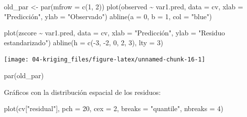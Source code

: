 \documentclass[
  spanish,
]{book}
\newenvironment{Shaded}{\begin{snugshade}}{\end{snugshade}}
\newcommand{\AttributeTok}[1]{\textcolor[rgb]{0.77,0.63,0.00}{#1}}
\newcommand{\DecValTok}[1]{\textcolor[rgb]{0.00,0.00,0.81}{#1}}
\newcommand{\FunctionTok}[1]{\textcolor[rgb]{0.00,0.00,0.00}{#1}}
\newcommand{\NormalTok}[1]{#1}
\newcommand{\OtherTok}[1]{\textcolor[rgb]{0.56,0.35,0.01}{#1}}
\newcommand{\SpecialCharTok}[1]{\textcolor[rgb]{0.00,0.00,0.00}{#1}}
\newcommand{\StringTok}[1]{\textcolor[rgb]{0.31,0.60,0.02}{#1}}
\theoremstyle{break}
\theoremstyle{definition}
\theoremstyle{definition}
\theoremstyle{definition}
\theoremstyle{definition}
\theoremstyle{remark}
\begin{document}
\begin{Shaded}
\begin{Highlighting}[]
\NormalTok{old\_par }\OtherTok{\textless{}{-}} \FunctionTok{par}\NormalTok{(}\AttributeTok{mfrow =} \FunctionTok{c}\NormalTok{(}\DecValTok{1}\NormalTok{, }\DecValTok{2}\NormalTok{))}
\FunctionTok{plot}\NormalTok{(observed }\SpecialCharTok{\textasciitilde{}}\NormalTok{ var1.pred, }\AttributeTok{data =}\NormalTok{ cv, }\AttributeTok{xlab =} \StringTok{"Predicción"}\NormalTok{, }\AttributeTok{ylab =} \StringTok{"Observado"}\NormalTok{)}
\FunctionTok{abline}\NormalTok{(}\AttributeTok{a =} \DecValTok{0}\NormalTok{, }\AttributeTok{b =} \DecValTok{1}\NormalTok{, }\AttributeTok{col =} \StringTok{"blue"}\NormalTok{)}

\FunctionTok{plot}\NormalTok{(zscore }\SpecialCharTok{\textasciitilde{}}\NormalTok{ var1.pred, }\AttributeTok{data =}\NormalTok{ cv, }\AttributeTok{xlab =} \StringTok{"Predicción"}\NormalTok{, }\AttributeTok{ylab =} \StringTok{"Residuo estandarizado"}\NormalTok{)}
\FunctionTok{abline}\NormalTok{(}\AttributeTok{h =} \FunctionTok{c}\NormalTok{(}\SpecialCharTok{{-}}\DecValTok{3}\NormalTok{, }\SpecialCharTok{{-}}\DecValTok{2}\NormalTok{, }\DecValTok{0}\NormalTok{, }\DecValTok{2}\NormalTok{, }\DecValTok{3}\NormalTok{), }\AttributeTok{lty =} \DecValTok{3}\NormalTok{)}
\end{Highlighting}
\end{Shaded}

\begin{center}\texttt{[image: 04-kriging\_files/figure-latex/unnamed-chunk-16-1]} \end{center}

\begin{Shaded}
\begin{Highlighting}[]
\FunctionTok{par}\NormalTok{(old\_par)}
\end{Highlighting}
\end{Shaded}

Gráficos con la distribución espacial de los residuos:

\begin{Shaded}
\begin{Highlighting}[]
\FunctionTok{plot}\NormalTok{(cv[}\StringTok{"residual"}\NormalTok{], }\AttributeTok{pch =} \DecValTok{20}\NormalTok{, }\AttributeTok{cex =} \DecValTok{2}\NormalTok{, }\AttributeTok{breaks =} \StringTok{"quantile"}\NormalTok{, }\AttributeTok{nbreaks =} \DecValTok{4}\NormalTok{)}
\end{Highlighting}
\end{Shaded}
\end{document}

